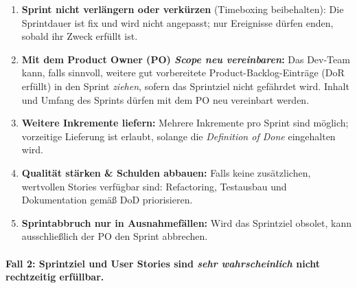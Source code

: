 \documentclass[12pt]{article}
\begin{document}
\begin{enumerate}

  \item \textbf{Sprint nicht verlängern oder verkürzen} (Timeboxing beibehalten): Die Sprintdauer ist fix und wird nicht angepasst; nur Ereignisse dürfen enden, sobald ihr Zweck erfüllt ist.
  
  \item \textbf{Mit dem Product Owner (PO) \emph{Scope neu vereinbaren}:} Das Dev-Team kann, falls sinnvoll, weitere gut vorbereitete Product-Backlog-Einträge (DoR erfüllt) in den Sprint \emph{ziehen}, sofern das Sprintziel nicht gefährdet wird. Inhalt und Umfang des Sprints dürfen mit dem PO neu vereinbart werden.

  \item \textbf{Weitere Inkremente liefern:} Mehrere Inkremente pro Sprint sind möglich; vorzeitige Lieferung ist erlaubt, solange die \emph{Definition of Done} eingehalten wird.
  
  \item \textbf{Qualität stärken \& Schulden abbauen:} Falls keine zusätzlichen, wertvollen Stories verfügbar sind: Refactoring, Testausbau und Dokumentation gemäß DoD priorisieren.

  \item \textbf{Sprintabbruch nur in Ausnahmefällen:} Wird das Sprintziel obsolet, kann ausschließlich der PO den Sprint abbrechen.

\end{enumerate}

\paragraph{Fall 2: Sprintziel und User Stories sind \emph{sehr wahrscheinlich} nicht rechtzeitig erfüllbar.}
\end{document}
